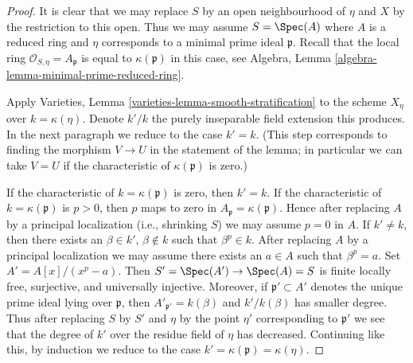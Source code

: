 \begin{proof}
It is clear that we may replace $S$ by an open neighbourhood of $\eta$
and $X$ by the restriction to this open.
Thus we may assume $S = \Spec(A)$ where $A$ is a reduced ring
and $\eta$ corresponds to a minimal prime ideal $\mathfrak p$.
Recall that the local ring $\mathcal{O}_{S, \eta} = A_\mathfrak p$
is equal to $\kappa(\mathfrak p)$ in this case, see
Algebra, Lemma \ref{algebra-lemma-minimal-prime-reduced-ring}.

\medskip\noindent
Apply Varieties, Lemma \ref{varieties-lemma-smooth-stratification}
to the scheme $X_\eta$ over $k = \kappa(\eta)$.
Denote $k'/k$ the purely inseparable field extension this produces.
In the next paragraph we reduce to the case $k' = k$.
(This step corresponds to finding the morphism $V \to U$ in
the statement of the lemma; in particular we can take $V = U$
if the characteristic of $\kappa(\mathfrak p)$ is zero.)

\medskip\noindent
If the characteristic of $k = \kappa(\mathfrak p)$ is zero, then
$k' = k$. If the characteristic of $k = \kappa(\mathfrak p)$
is $p > 0$, then $p$ maps to zero in $A_\mathfrak p = \kappa(\mathfrak p)$.
Hence after replacing $A$ by a principal localization (i.e.,
shrinking $S$) we may assume $p = 0$ in $A$. If $k' \not = k$, then
there exists an $\beta \in k'$, $\beta \not \in k$
such that $\beta^p \in k$. After replacing $A$ by a principal
localization we may assume there exists an $a \in A$ such
that $\beta^p = a$. Set $A' = A[x]/(x^p - a)$.
Then $S' = \Spec(A') \to \Spec(A) = S$ is finite locally free,
surjective, and universally injective. Moreover, if $\mathfrak p' \subset A'$
denotes the unique prime ideal lying over $\mathfrak p$,
then $A'_{\mathfrak p'} = k(\beta)$ and $k'/k(\beta)$
has smaller degree. Thus after replacing $S$ by $S'$
and $\eta$ by the point $\eta'$ corresponding to $\mathfrak p'$
we see that the degree of $k'$ over the residue field of $\eta$
has decreased. Continuing like this, by induction we reduce
to the case $k' = \kappa(\mathfrak p) = \kappa(\eta)$.


\end{proof}
